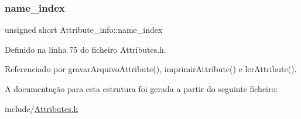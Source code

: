 \subsubsection{\texorpdfstring{name\+\_\+index}{name\_index}}
{\footnotesize\ttfamily unsigned short Attribute\+\_\+info\+::name\+\_\+index}



Definido na linha 75 do ficheiro Attributes.\+h.



Referenciado por gravar\+Arquivo\+Attribute(), imprimir\+Attribute() e ler\+Attribute().



A documentação para esta estrutura foi gerada a partir do seguinte ficheiro\+:\begin{DoxyCompactItemize}
\item 
include/\hyperlink{Attributes_8h}{Attributes.\+h}\end{DoxyCompactItemize}
